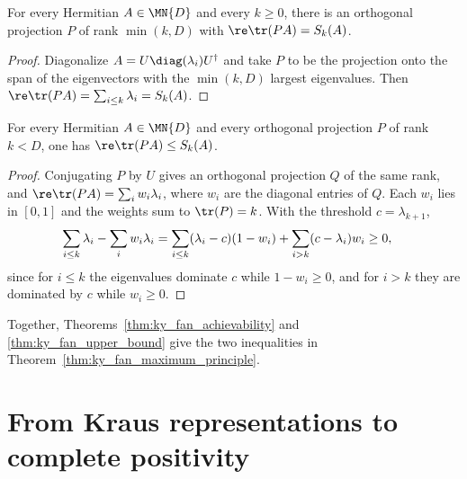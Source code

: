 \begin{theorem}
    \label{thm:ky_fan_achievability}
    \leanok
    For every Hermitian $A\in\MN{D}$ and every $k\ge0$, there is an orthogonal
    projection $P$ of rank $\min(k,D)$ with $\re\tr(PA)=S_k(A)$.
\end{theorem}

\begin{proof}\leanok
    Diagonalize $A=U\diag(\lambda_i)U^\dagger$ and take $P$ to be the
    projection onto the span of the eigenvectors with the $\min(k,D)$ largest
    eigenvalues. Then $\re\tr(PA)=\sum_{i\le k}\lambda_i=S_k(A)$.
\end{proof}

\begin{theorem}
    \label{thm:ky_fan_upper_bound}
    \leanok
    For every Hermitian $A\in\MN{D}$ and every orthogonal projection $P$ of
    rank $k<D$, one has $\re\tr(PA)\le S_k(A)$.
\end{theorem}

\begin{proof}\leanok
    Conjugating $P$ by $U$ gives an orthogonal projection $Q$ of the same
    rank, and $\re\tr(PA)=\sum_iw_i\lambda_i$, where $w_i$ are the diagonal
    entries of $Q$. Each $w_i$ lies in $[0,1]$ and the weights sum to
    $\tr(P)=k$. With the threshold $c=\lambda_{k+1}$,
    \begin{align}
        \sum_{i\le k}\lambda_i-\sum_iw_i\lambda_i
         & =\sum_{i\le k}(\lambda_i-c)(1-w_i)
        +\sum_{i>k}(c-\lambda_i)w_i
        \ge0,
        \notag
    \end{align}
    since for $i\le k$ the eigenvalues dominate $c$ while $1-w_i\ge0$, and
    for $i>k$ they are dominated by $c$ while $w_i\ge0$.
\end{proof}

Together, Theorems~\ref{thm:ky_fan_achievability} and
\ref{thm:ky_fan_upper_bound} give the two inequalities in
Theorem~\ref{thm:ky_fan_maximum_principle}.

\section{From Kraus representations to complete positivity}

